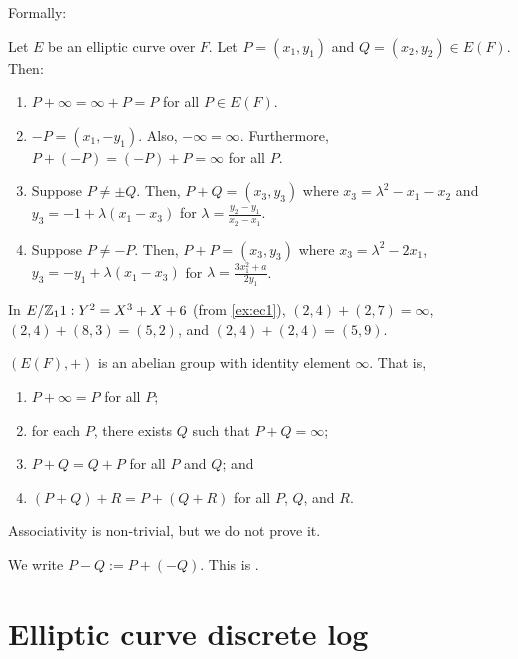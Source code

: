 \documentclass[class=co487,tikz,minted,notes]{agony}
\begin{document}
Formally:

\begin{defn}
  Let $E$ be an elliptic curve over $F$.
  Let $P = (x_1,y_1)$ and $Q = (x_2,y_2) \in E(F)$.
  Then:
  \begin{enumerate}[nosep]
    \item $P + \infty = \infty + P = P$ for all $P \in E(F)$.
    \item $-P = (x_1,-y_1)$. Also, $-\infty = \infty$.
          Furthermore, $P + (-P) = (-P) + P = \infty$ for all $P$.
    \item Suppose $P \neq \pm Q$.
          Then, $P + Q = (x_3,y_3)$ where $x_3 = \lambda^2 - x_1 - x_2$
          and $y_3 = -1 + \lambda(x_1-x_3)$ for $\lambda = \frac{y_2-y_1}{x_2-x_1}$.
    \item Suppose $P \neq -P$. Then, $P + P = (x_3,y_3)$ where
          $x_3 = \lambda^2 - 2x_1$, $y_3 = -y_1 + \lambda(x_1-x_3)$ for $\lambda = \frac{3x_1^2 + a}{2y_1}$.
  \end{enumerate}
\end{defn}

\begin{example}
  In $E/\mathbb{Z}_11 : Y^2 = X^3 + X + 6$ (from \cref{ex:ec1}),
  $(2,4) + (2,7) = \infty$, $(2,4) + (8,3) = (5,2)$,
  and $(2,4) + (2,4) = (5,9)$.
\end{example}

\begin{prop}
  $(E(F), +)$ is an abelian group with identity element $\infty$. That is,
  \begin{enumerate}[nosep]
    \item $P + \infty = P$ for all $P$;
    \item for each $P$, there exists $Q$ such that $P + Q = \infty$;
    \item $P + Q = Q + P$ for all $P$ and $Q$; and
    \item $(P + Q) + R = P + (Q + R)$ for all $P$, $Q$, and $R$.
  \end{enumerate}
\end{prop}

Associativity is non-trivial, but we do not prove it.

We write $P - Q := P + (-Q)$. This is .

\section{Elliptic curve discrete log}
\end{document}
